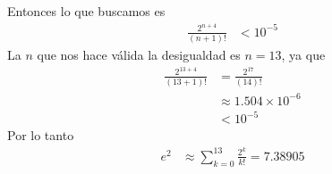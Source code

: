 \documentclass[a4paper]{article}
\begin{document}
Entonces lo que buscamos es
\begin{align*}
    \frac{2^{n+4}}{(n + 1)!} &< 10^{-5}
\end{align*}
La \(n\) que nos hace válida la desigualdad es \(n = 13\), ya que
\begin{align*}
    \frac{2^{13+4}}{(13 + 1)!} &= \frac{2^{17}}{(14)!} \\
                               &\approx 1{.}504 \times 10^{-6} \\
                               &< 10^{-5}
\end{align*}
Por lo tanto
\begin{align*}
    e^{2} &\approx \sum_{k = 0}^{13} \frac{2^k}{k!} = 7{.}38905
\end{align*}
\end{document}
